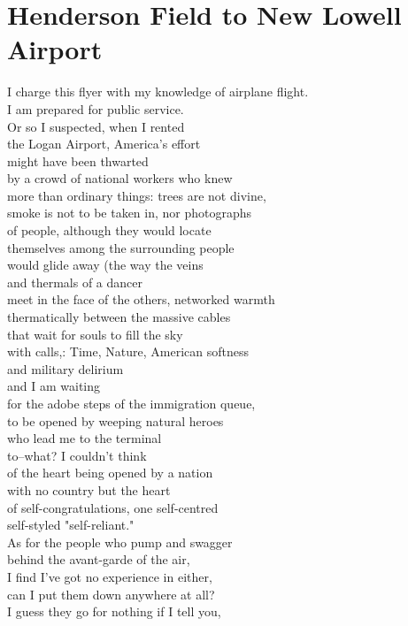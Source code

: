 \documentclass[smalldemyvopaper,11pt,twoside,onecolumn,openright,extrafontsizes]{memoir}
\begin{document}
\chapter{Henderson Field to New Lowell Airport}
I charge this flyer with my knowledge of airplane flight.
\\I am prepared for public service.
\\Or so I suspected, when I rented
\\the Logan Airport, America's effort
\\might have been thwarted
\\by a crowd of national workers who knew
\\more than ordinary things: trees are not divine,
\\smoke is not to be taken in, nor photographs
\\of people, although they would locate
\\themselves among the surrounding people
\\would glide away (the way the veins
\\and thermals of a dancer
\\meet in the face of the others, networked warmth
\\thermatically between the massive cables
\\that wait for souls to fill the sky
\\with calls,: Time, Nature, American softness
\\and military delirium
\\and I am waiting
\\for the adobe steps of the immigration queue,
\\to be opened by weeping natural heroes
\\who lead me to the terminal
\\to--what? I couldn't think
\\of the heart being opened by a nation
\\with no country but the heart
\\of self-congratulations, one self-centred
\\self-styled "self-reliant."
\\As for the people who pump and swagger
\\behind the avant-garde of the air,
\\I find I've got no experience in either,
\\can I put them down anywhere at all?
\\I guess they go for nothing if I tell you,
\end{document}
